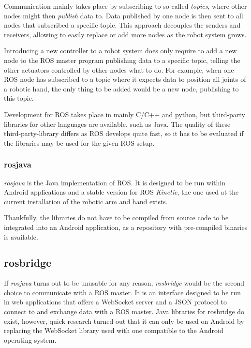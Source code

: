 \documentclass[a4paper]{article}
\begin{document}
Communication mainly takes place by subscribing to so-called \textit{topics}, where other nodes might then \textit{publish} data to. Data published by one node is then sent to all nodes that subscribed a specific topic. This approach decouples the senders and receivers, allowing to easily replace or add more nodes as the robot system grows.

Introducing a new controller to a robot system does only require to add a new node to the ROS master program publishing data to a specific topic, telling the other actuators controlled by other nodes what to do. For example, when one ROS node has subscribed to a topic where it expects data to position all joints of a robotic hand, the only thing to be added would be a new node, publishing to this topic.

Development for ROS takes place in mainly C/C++ and python, but third-party libraries for other languages are available, such as Java. The quality of these third-party-library differs as ROS develops quite fast, so it has to be evaluated if the libraries may be used for the given ROS setup.

\subsubsection{rosjava}

\textit{rosjava} is the Java implementation of ROS. It is designed to be run within Android applications and a stable version for ROS \textit{Kinetic}, the one used at the current installation of the robotic arm and hand exists. 

Thankfully, the libraries do not have to be compiled from source code to be integrated into an Android application, as a repository with pre-compiled binaries is available.

\subsection{rosbridge}

If \textit{rosjava} turns out to be unusable for any reason, \textit{rosbridge} would be the second choice to communicate with a ROS master. It is an interface designed to be run in web applications that offers a WebSocket server and a JSON protocol to connect to and exchange data with a ROS master. Java libraries for rosbridge do exist, however, quick research turned out that it can only be used on Android by replacing the WebSocket library used with one compatible to the Android operating system.
\end{document}
